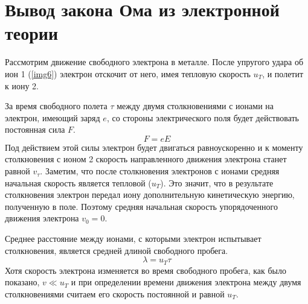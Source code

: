 \documentclass[a4paper,10pt]{book}
\begin{document}
\section{Вывод закона Ома из электронной теории}
Рассмотрим движение свободного электрона в металле. После упругого удара об ион 1 (\ref{img6}) электрон отскочит от него, имея тепловую скорость
$u_T$, и полетит к иону 2.

За время свободного полета $\tau$ между двумя столкновениями с ионами на электрон, имеющий заряд $e$, со стороны электрического поля будет
действовать постоянная сила $F$.
\begin{equation}\label{162}
 F = eE
\end{equation}
Под действием этой силы электрон будет двигаться равноускоренно и к моменту столкновения с ионом 2 скорость направленного движения электрона
станет равной $v_\tau$. Заметим, что после столкновения электронов с ионами средняя начальная скорость является тепловой ($u_T$). Это значит, 
что в результате столкновения электрон передал иону дополнительную кинетическую энергию, полученную в поле. Поэтому средняя начальная скорость
упорядоченного движения электрона $v_0 = 0$.

Среднее расстояние между ионами, с которыми электрон испытывает столкновения, является средней длиной свободного пробега.
\begin{equation}\label{163}
 \lambda = u_T\tau
\end{equation}
Хотя скорость электрона изменяется во время свободного пробега, как было показано, $v \ll u_T$ и при определении времени движения электрона
между двумя столкновениями считаем его скорость постоянной и равной $u_T$.
\end{document}
